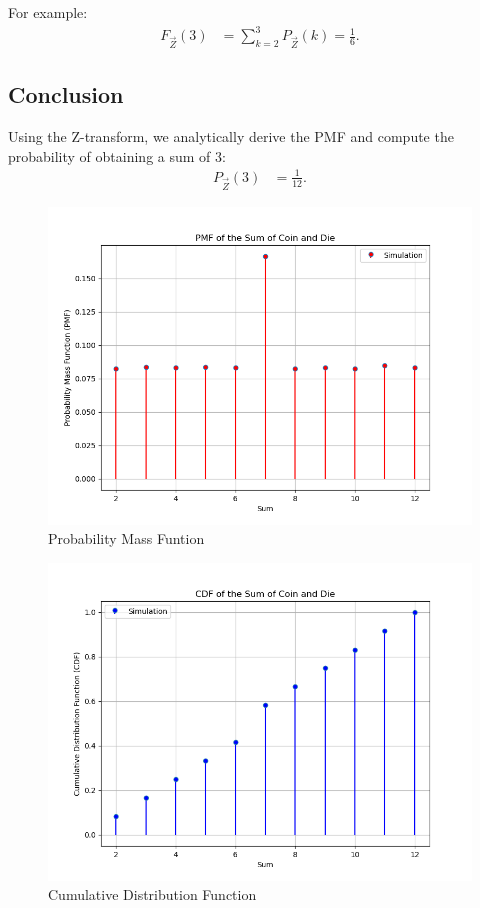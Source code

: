 \documentclass[journal]{IEEEtran}
\begin{document}
For example:
\begin{align}
F_{\vec{Z}}(3) &= \sum_{k=2}^{3} P_{\vec{Z}}(k) = \frac{1}{6}.
\end{align}

\subsection*{Conclusion}
Using the Z-transform, we analytically derive the PMF and compute the probability of obtaining a sum of $3$:
\begin{align}
P_{\vec{Z}}(3) &= \frac{1}{12}.
\end{align}




\begin{figure}[h]
\centering
\includegraphics[width=\columnwidth]{figs/pmf.png}
\caption{Probability Mass Funtion}
\label{fig:Plot1} 
\end{figure}

\begin{figure}[h]
\centering
\includegraphics[width=\columnwidth]{figs/cdf.png}
\caption{Cumulative Distribution Function}
\label{fig:Plot1} 
\end{figure}
\end{document}
